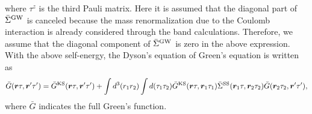 %
where $\tau^z$ is the third Pauli matrix. 
Here it is assumed that the diagonal part of $\bar{\Sigma}^{\rm GW}$ is canceled
because the mass renormalization due to the Coulomb interaction is already considered through the
band calculations. Therefore, we assume that the diagonal component of 
$\bar{\Sigma}^{\rm GW}$ is zero in the above expression. With the above self-energy, the 
Dyson's equation of Green's equation is written as 
%
\begin{equation}
	\bar{G}(\bm r \tau, \bm r' \tau') = \bar{G}^{\rm KS}(\bm r \tau, \bm r' \tau') +
	\int d^{3}(r_1 r_2)\int d(\tau_1 \tau_2)\bar{G}^{\rm KS}(\bm r \tau, \bm r_1 \tau_1)
	\bar{\Sigma}^{\rm SS}(\bm r_1 \tau, \bm r_2 \tau_2)\bar{G}(\bm r_2 \tau_2, \bm r' \tau'),
	\label{eq:GDysoneq}
\end{equation}
%
where $\bar{G}$ indicates the full Green's function. 

